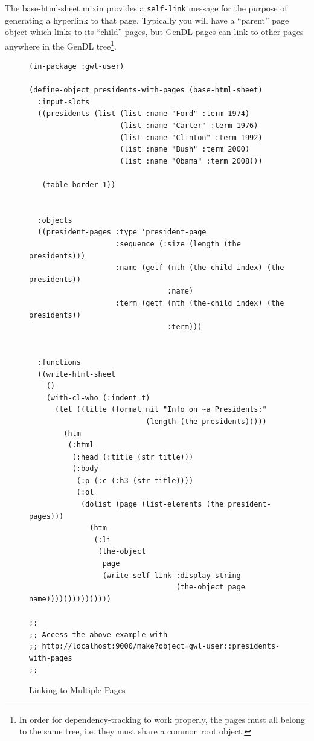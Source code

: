 \documentclass [11pt]{book}
\begin{document}
The base-html-sheet mixin provides a \texttt{self-link} message for the purpose of generating a hyperlink to that
page. Typically you will have a ``parent'' page object which links to
its ``child'' pages, but GenDL pages can link to other pages anywhere
in the GenDL tree\footnote{In order for dependency-tracking to work
properly, the pages must all belong to the same tree, i.e. they must
share a common root object.}.
\begin{figure}
\begin{lrbox}{\boxedverb}
\begin{minipage}{\linewidth}
\tiny{

\begin{verbatim}(in-package :gwl-user)

(define-object presidents-with-pages (base-html-sheet)
  :input-slots
  ((presidents (list (list :name "Ford" :term 1974)
                     (list :name "Carter" :term 1976)
                     (list :name "Clinton" :term 1992)
                     (list :name "Bush" :term 2000)
                     (list :name "Obama" :term 2008)))
   
   (table-border 1))
  
  
  :objects
  ((president-pages :type 'president-page
                    :sequence (:size (length (the presidents)))
                    :name (getf (nth (the-child index) (the presidents))
                                :name)
                    :term (getf (nth (the-child index) (the presidents))
                                :term)))


  :functions
  ((write-html-sheet
    () 
    (with-cl-who (:indent t)
      (let ((title (format nil "Info on ~a Presidents:" 
                           (length (the presidents)))))
        (htm
         (:html 
          (:head (:title (str title)))
          (:body 
           (:p (:c (:h3 (str title))))
           (:ol
            (dolist (page (list-elements (the president-pages)))
              (htm      
               (:li
                (the-object 
                 page 
                 (write-self-link :display-string 
                                  (the-object page name)))))))))))))))

;;
;; Access the above example with 
;; http://localhost:9000/make?object=gwl-user::presidents-with-pages
;;

\end{verbatim}}
\end{minipage}
\end{lrbox}
\fbox{\usebox{\boxedverb}}

\caption{Linking to Multiple Pages}

\label{fig:gwl-3}

\end{figure}
\end{document}
